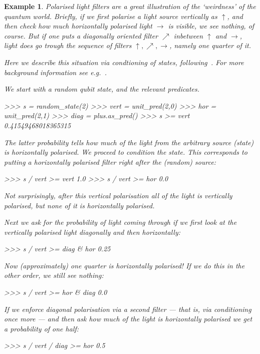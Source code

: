 \documentclass[leqno]{tufte-book} %
\newtheorem{example}[theorem]{Example}
\newcommand{\hairsp}{\hspace{1pt}} %
\newcommand{\eg}{\textit{e.\hairsp{}g.}\xspace} %
\begin{document}
\begin{example}
\label{ex:polarisation}
Polarised light filters are a great illustration of the `weirdness' of
the quantum world. Briefly, if we first polarise a
light source vertically as $\uparrow$, and then check how much
horizontally polarised light $\rightarrow$ is visible, we see nothing,
of course. But if one puts a diagonally oriented filter $\nearrow$
inbetween $\uparrow$ and $\rightarrow$, light does go trough the
sequence of filters $\uparrow, \nearrow, \rightarrow$, namely one
quarter of it.

Here we describe this situation via condtioning of states,
following~\cite{Jacobs15}. For more background information see
\eg~\cite{RieffelP11}.

We start with a random qubit state, and the relevant predicates.
\begin{python}
>>> s = random_state(2)
>>> vert = unit_pred(2,0)
>>> hor = unit_pred(2,1)
>>> diag = plus.as_pred()
>>> s >= vert
0.41549468018365315
\end{python}

\noindent The latter probability tells how much of the light from the
arbitrary source (state) is horizontally polarised.  We proceed to
condition the state. This corresponds to putting a horizontally
polarised filter right after the (random) source:
\begin{python}
>>> s / vert >= vert
1.0
>>> s / vert >= hor
0.0
\end{python}

\noindent Not surprisingly, after this vertical polarisation all of
the light is vertically polarised, but none of it is horizontally
polarised.

Next we ask for the probability of light coming through if we first
look at the vertically polarised light diagonally \emph{and then}
horizontally:
\begin{python}
>>> s / vert >= diag & hor
0.25
\end{python}

\noindent Now (approximately) one quarter is horizontally polarised!
If we do this in the other order, we still see nothing:
\begin{python}
>>> s / vert >= hor & diag
0.0
\end{python}

\noindent If we enforce diagonal polarisation via a second filter ---
that is, via conditioning once more --- and then ask how much of the
light is horizontally polarised we get a probability of one half:
\begin{python}
>>> s / vert / diag >= hor
0.5
\end{python}
\end{example}
\end{document}
